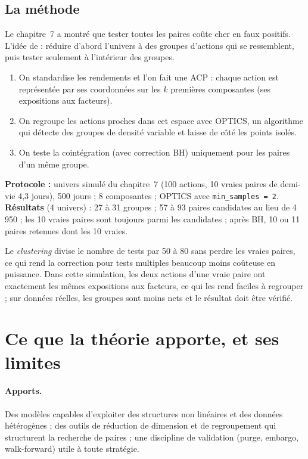 \subsection{La méthode}

Le chapitre~7 a montré que tester toutes les paires coûte cher en faux positifs. L'idée de \citet{sarmento2020} : réduire d'abord l'univers à des groupes d'actions qui se ressemblent, puis tester seulement à l'intérieur des groupes.
\begin{enumerate}
\item On standardise les rendements et l'on fait une ACP : chaque action est représentée par ses coordonnées sur les $k$ premières composantes (ses \og expositions\fg{} aux facteurs).
\item On regroupe les actions proches dans cet espace avec OPTICS, un algorithme qui détecte des groupes de densité variable et laisse de côté les points isolés.
\item On teste la cointégration (avec correction BH) uniquement pour les paires d'un même groupe.
\end{enumerate}

\begin{codebox}
\textbf{Protocole :} univers simulé du chapitre~7 (100 actions, 10 vraies paires de demi-vie 4,3 jours), 500 jours ; 8 composantes ; OPTICS avec \texttt{min\_samples = 2}. \textbf{Résultats} (4 univers) : 27 à 31 groupes ; 57 à 93 paires candidates au lieu de 4\,950 ; les 10 vraies paires sont toujours parmi les candidates ; après BH, 10 ou 11 paires retenues dont les 10 vraies.
\end{codebox}

Le \emph{clustering} divise le nombre de tests par 50 à 80 sans perdre les vraies paires, ce qui rend la correction pour tests multiples beaucoup moins coûteuse en puissance. Dans cette simulation, les deux actions d'une vraie paire ont exactement les mêmes expositions aux facteurs, ce qui les rend faciles à regrouper ; sur données réelles, les groupes sont moins nets et le résultat doit être vérifié.

\section{Ce que la théorie apporte, et ses limites}

\paragraph{Apports.} Des modèles capables d'exploiter des structures non linéaires et des données hétérogènes ; des outils de réduction de dimension et de regroupement qui structurent la recherche de paires ; une discipline de validation (purge, embargo, walk-forward) utile à toute stratégie.

